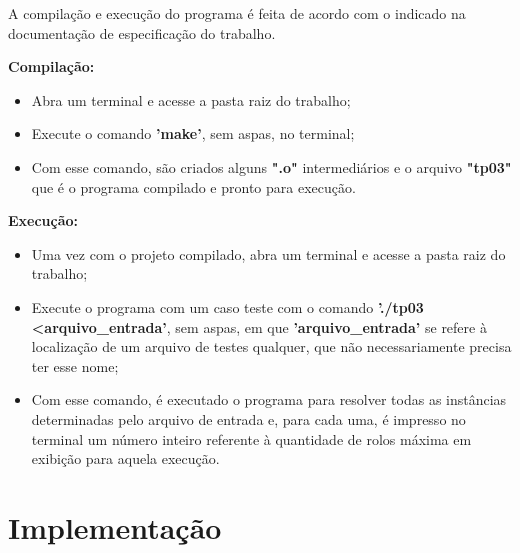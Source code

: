 \documentclass[12pt]{article}
\begin{document}
    \par A compilação e execução do programa é feita de acordo com o indicado na documentação de especificação do trabalho.
    \par \textbf{Compilação:}
    \begin{itemize}
    \item Abra um terminal e acesse a pasta raiz do trabalho;
    \item Execute o comando \textbf{'make'}, sem aspas, no terminal;
    \item Com esse comando, são criados alguns \textbf{".o"} intermediários e o arquivo \textbf{"tp03"} que é o programa compilado e pronto para execução.
    \end{itemize}
    \par \textbf{Execução:}
    \begin{itemize}
    \item Uma vez com o projeto compilado, abra um terminal e acesse a pasta raiz do trabalho;
    \item Execute o programa com um caso teste com o comando \textbf{'./tp03 \textless \space arquivo\_entrada'}, sem aspas, em que \textbf{'arquivo\_entrada'} se refere à localização de um arquivo de testes qualquer, que não necessariamente precisa ter esse nome;
    \item Com esse comando, é executado o programa para resolver todas as instâncias determinadas pelo arquivo de entrada e, para cada uma, é impresso no terminal um número inteiro referente à quantidade de rolos máxima em exibição para aquela execução.
    \end{itemize}
    

\section{Implementação}
\end{document}
